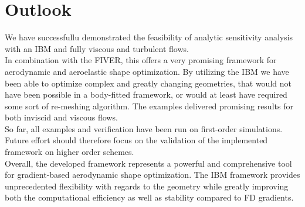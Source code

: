 \documentclass[../main.tex]{subfiles}
\begin{document}
\section{Outlook}\label{sec:outlook}
We have successfullu demonstrated the feasibility of  analytic sensitivity analysis with an \acf{IBM} and fully viscous and turbulent flows.\\
In combination with the \acf{FIVER}, this offers a very promising framework for aerodynamic and aeroelastic shape optimization. By utilizing the \ac{IBM} we have been able to optimize complex and greatly changing geometries, that would not have been possible in a body-fitted framework, or would at least have required some sort of re-meshing algorithm. The examples delivered promising results for both inviscid and viscous flows.\\
So far, all examples and verification have been run on first-order simulations. Future effort should therefore focus on the validation of the implemented framework on higher order schemes.\\
Overall, the developed framework represents a powerful and comprehensive tool for gradient-based aerodynamic shape optimization. The \ac{IBM} framework provides unprecedented flexibility with regards to the geometry while greatly improving both the computational efficiency as well as stability compared to \ac{FD} gradients.
\end{document}
